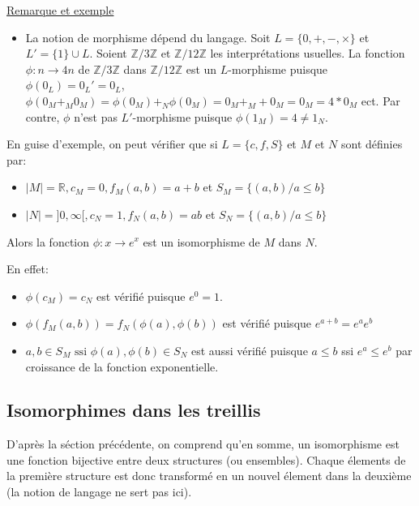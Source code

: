 \documentclass[a4paper, 11pt]{article}
\begin{document}
\noindent
\underline{Remarque et exemple}

\begin{itemize}
    \item La notion de morphisme dépend du langage. Soit $L = \{0, +, -, \times\}$ et $L' = \{1\} \cup L$. Soient $\mathbb{Z}/3\mathbb{Z}$ et $\mathbb{Z}/12\mathbb{Z}$ les interprétations usuelles. La fonction $\phi: n \rightarrow 4n$ de $\mathbb{Z}/3\mathbb{Z}$ dans $\mathbb{Z}/12\mathbb{Z}$ est un $L$-morphisme puisque $\phi(0_L) = 0_L' = 0_L$, $\phi(0_M +_M 0_M) = \phi(0_M) +_N \phi(0_M) = 0_M +_M + 0_M = 0_M = 4*0_M$ ect. Par contre, $\phi$ n'est pas $L'$-morphisme puisque $\phi(1_M) = 4 \neq 1_N$.
\end{itemize}

En guise d'exemple, on peut vérifier que si $L = \{c,f,S\}$ et $M$ et $N$ sont définies par:

\begin{itemize}
    \item $|M| = \mathbb{R}, c_M = 0, f_M(a,b) = a + b$ et $S_M = \{(a,b) / a \leq b\}$
    \item $|N| = ]0, \infty [, c_N = 1, f_N(a,b) = ab$ et $S_N = \{(a,b) / a \leq b \}$
\end{itemize}

Alors la fonction $\phi : x \rightarrow e^{x}$ est un isomorphisme de $M$ dans $N$.

En effet:

\begin{itemize}
    \item $\phi(c_M) = c_N$ est vérifié puisque $e^0 = 1$.
    \item $\phi(f_M(a,b)) = f_N(\phi(a),\phi(b))$ est vérifié puisque $e^{a + b} = e^ae^b$
    \item $a,b \in S_M \text{ ssi } \phi(a),\phi(b) \in S_N$ est aussi vérifié puisque $a \leq b$ ssi $e^a \leq e^b$ par croissance de la fonction exponentielle.
\end{itemize}

\subsection{Isomorphimes dans les treillis}

D'après la séction précédente, on comprend qu'en somme, un isomorphisme est une fonction bijective entre deux structures (ou ensembles). Chaque élements de la première structure est donc transformé en un nouvel élement dans la deuxième (la notion de langage ne sert pas ici). 
\end{document}
